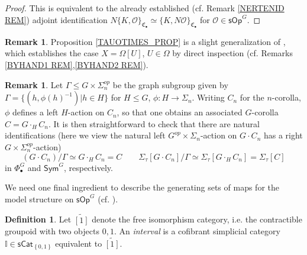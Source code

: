 \documentclass[a4paper,10pt
,draft
]{article}%
\numberwithin{equation}{section}
\numberwithin{figure}{section}
\theoremstyle{definition} %
\newtheorem{definition}[equation]{Definition}%
\newtheorem{remark}[equation]{Remark}%
\newcommand{\set}[1]{\left\{#1\right\}}%
\renewcommand{\O}{\ensuremath{\mathcal O}}
\newcommand{\1}{\ensuremath{\mathbbm 1}}%
\begin{document}
\begin{proof}
	This is equivalent to the 
	already established (cf. Remark \ref{NERTENID REM}) adjoint identification
	$
	N \{K,\O\}_{\mathfrak{C}_{\bullet}}
	\simeq
	\{K,N \O\}_{\mathfrak{C}_{\bullet}} 
	$
	for $\O \in \mathsf{sOp}^G$.	
\end{proof}



\begin{remark}
	Proposition \ref{TAUOTIMES_PROP} is a slight generalization of 
	\cite[Prop. 7.2]{CM13b},
	which establishes the case
	$X = \Omega[U]$, $U\in \Omega$
	by direct inspection
	(cf. Remarks \ref{BYHAND1 REM},\ref{BYHAND2 REM}).
\end{remark}



\begin{remark}\label{SIGMATAUQUOT REM}
Let $\Gamma \leq G \times \Sigma_n^{op}$
be the graph subgroup given by
$\Gamma = \{(h,\phi(h)^{-1})|h\in H\}$
for $H\leq G$, $\phi\colon H \to \Sigma_n$.
Writing
$C_{n}$ for the $n$-corolla, 
$\phi$ defines a left $H$-action on $C_{n}$,
so that one obtains an associated
$G$-corolla $C = G \cdot_{H} C_{n}$.
It is then straightforward to check that there are natural identifications
(here we view the natural 
left $G^{op}\times \Sigma_n$-action on 
$G \cdot C_{n}$ has a 
right $G\times \Sigma_n^{op}$-action)
\begin{equation}\label{SIGMATAUQUOT EQ}
	(G \cdot C_{n})/\Gamma
\simeq
	G \cdot_H C_{n}
= 
	C
\qquad
	\Sigma_{\tau}[G \cdot C_{n}]/\Gamma
\simeq
	\Sigma_{\tau}[G \cdot_H C_{n}]
= 
	\Sigma_{\tau}[C]
\end{equation}
in $\Phi^G_{\bullet}$ and $\mathsf{Sym}^G$, respectively.
\end{remark}


We need one final ingredient to describe the generating sets of maps for the model structure on
$\mathsf{sOp}^G$
(cf. \cite[Def. 4.4]{BP_HGOP}).


\begin{definition}
	Let $\widetilde{[1]}$ denote the free isomorphism category,
	i.e. the contractible groupoid with two objects $0,1$.
%		
	An \textit{interval} is a cofibrant simplicial category $\mathbb I \in \mathsf{sCat}_{\set{0,1}}$ equivalent to $\widetilde{[1]}$.
\end{definition}

\end{document}
